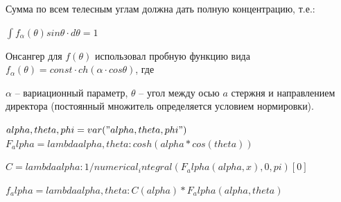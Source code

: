 \documentclass[11pt]{article}
\begin{document}
    Сумма по всем телесным углам должна дать полную концентрацию, т.е.:

\(\int f_{\alpha}\left(\theta\right) sin \theta \cdot d\theta = 1\)

Онсангер для \(f\left(\theta\right)\) использовал пробную функцию вида
\(f_{\alpha}\left(\theta\right) = const \cdot ch \left(\alpha \cdot cos \theta \right)\),
где

\(\alpha\) -- вариационный параметр, \(\theta\) -- угол между осью \(a\)
стержня и направлением директора (постоянный множитель определяется
условием нормировки).

$alpha, theta, phi = var("alpha, theta, phi")$
$F_alpha = lambda alpha, theta : cosh (alpha * cos(theta))$


$C = lambda alpha : 1 / numerical_integral(F_alpha(alpha, x), 0, pi) [0]$


$f_alpha = lambda alpha, theta : C(alpha) * F_alpha (alpha, theta)$

\end{document}

